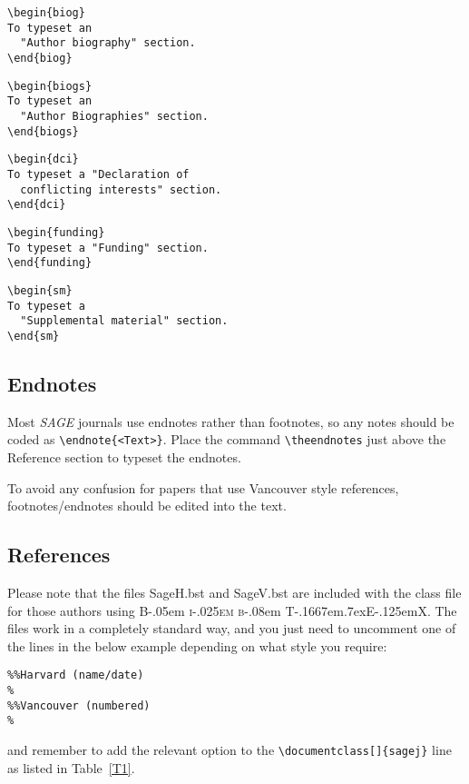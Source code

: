 \documentclass[Afour,sageh,times]{sagej}
\newcommand\BibTeX{{\rmfamily B\kern-.05em \textsc{i\kern-.025em b}\kern-.08em
T\kern-.1667em\lower.7ex\hbox{E}\kern-.125emX}}
\begin{document}
\begin{verbatim}
\begin{biog}
To typeset an
  "Author biography" section.
\end{biog}
\end{verbatim}

\begin{verbatim}
\begin{biogs}
To typeset an
  "Author Biographies" section.
\end{biogs}
\end{verbatim}


\begin{verbatim}
\begin{dci}
To typeset a "Declaration of
  conflicting interests" section.
\end{dci}
\end{verbatim}

\begin{verbatim}
\begin{funding}
To typeset a "Funding" section.
\end{funding}
\end{verbatim}

\begin{verbatim}
\begin{sm}
To typeset a
  "Supplemental material" section.
\end{sm}
\end{verbatim}

\subsection{Endnotes}
Most \textit{SAGE} journals use endnotes rather than footnotes, so any notes should be coded as \verb+\endnote{<Text>}+.
Place the command \verb+\theendnotes+ just above the Reference section to typeset the endnotes.

To avoid any confusion for papers that use Vancouver style references,  footnotes/endnotes should be edited into the text.

\subsection{References}
Please note that the files \textsf{SageH.bst} and \textsf{SageV.bst} are included with the class file
for those authors using \BibTeX.
The files work in a completely standard way, and you just need to uncomment one of the lines in the below example depending on what style you require:
\begin{verbatim}
%%Harvard (name/date)
%
%%Vancouver (numbered)
%

\end{verbatim}
and remember to add the relevant option to the \verb+\documentclass[]{sagej}+ line as listed in Table~\ref{T1}. 
\end{document}
